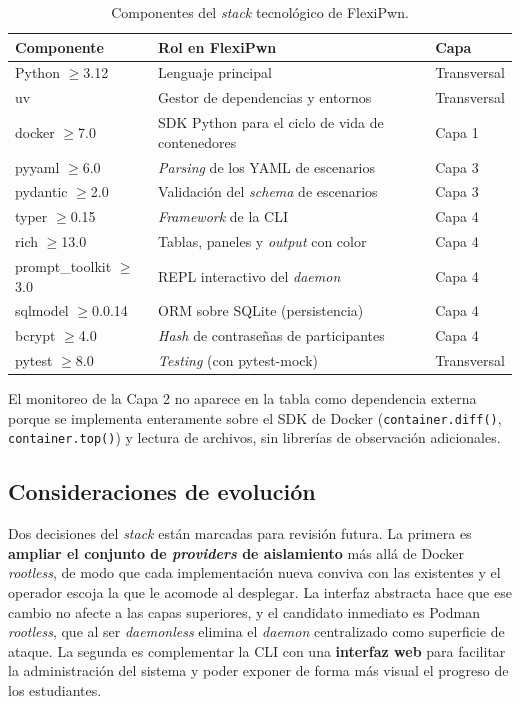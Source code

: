 \begin{table}[h]
\centering
\caption{Componentes del \textit{stack} tecnológico de FlexiPwn.}
\label{tab:stack}
\begin{tabular}{|l|l|l|}
\hline
\textbf{Componente} & \textbf{Rol en FlexiPwn} & \textbf{Capa} \\
\hline
Python $\geq$3.12 & Lenguaje principal & Transversal \\
uv & Gestor de dependencias y entornos & Transversal \\
docker $\geq$7.0 & SDK Python para el ciclo de vida de contenedores & Capa 1 \\
pyyaml $\geq$6.0 & \textit{Parsing} de los YAML de escenarios & Capa 3 \\
pydantic $\geq$2.0 & Validación del \textit{schema} de escenarios & Capa 3 \\
typer $\geq$0.15 & \textit{Framework} de la CLI & Capa 4 \\
rich $\geq$13.0 & Tablas, paneles y \textit{output} con color & Capa 4 \\
prompt\_toolkit $\geq$3.0 & REPL interactivo del \textit{daemon} & Capa 4 \\
sqlmodel $\geq$0.0.14 & ORM sobre SQLite (persistencia) & Capa 4 \\
bcrypt $\geq$4.0 & \textit{Hash} de contraseñas de participantes & Capa 4 \\
pytest $\geq$8.0 & \textit{Testing} (con pytest-mock) & Transversal \\
\hline
\end{tabular}
\end{table}

El monitoreo de la Capa 2 no aparece en la tabla como dependencia externa porque
se implementa enteramente sobre el SDK de Docker (\texttt{container.diff()},
\texttt{container.top()}) y lectura de archivos, sin librerías de observación
adicionales.

\subsection{Consideraciones de evolución}

Dos decisiones del \textit{stack} están marcadas para revisión futura. La
primera es \textbf{ampliar el conjunto de \textit{providers} de aislamiento}
más allá de Docker \textit{rootless}, de modo que cada implementación nueva
conviva con las existentes y el operador escoja la que le acomode al desplegar.
La interfaz abstracta hace que ese cambio no afecte a las capas superiores, y el
candidato inmediato es Podman \textit{rootless}, que al ser \textit{daemonless}
elimina el \textit{daemon} centralizado como superficie de ataque. La segunda es
complementar la CLI con una \textbf{interfaz web} para
facilitar la administración del sistema y poder exponer de forma más visual el
progreso de los estudiantes.

